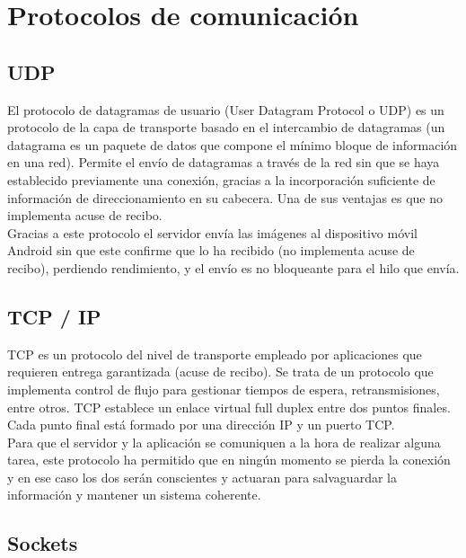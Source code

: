 \section{Protocolos de comunicación}

\subsection{UDP}

El protocolo de datagramas de usuario (User Datagram Protocol o UDP) es un protocolo de la capa de transporte basado en el intercambio de datagramas (un datagrama es un paquete de datos que compone el mínimo bloque de información en una red). Permite el envío de datagramas a través de la red sin que se haya establecido previamente una conexión, gracias a la incorporación suficiente de información de direccionamiento en su cabecera. Una de sus ventajas es que no implementa acuse de recibo.\\
Gracias a este protocolo el servidor envía las imágenes al dispositivo móvil Android sin que este confirme que lo ha recibido (no implementa acuse de recibo), perdiendo rendimiento, y el envío es no bloqueante para el hilo que envía.

\subsection{TCP / IP}

TCP es un protocolo del nivel de transporte empleado por aplicaciones que requieren entrega garantizada (acuse de recibo). Se trata de un protocolo que implementa control de flujo para gestionar tiempos de espera, retransmisiones, entre otros. TCP establece un enlace virtual full duplex entre dos puntos finales. Cada punto final está formado por una dirección IP y un puerto TCP.\\
Para que el servidor y la aplicación se comuniquen a la hora de realizar alguna tarea, este protocolo ha permitido que en ningún momento se pierda la conexión y en ese caso los dos serán conscientes y actuaran para salvaguardar la información y mantener un sistema coherente.

\subsection{Sockets}

